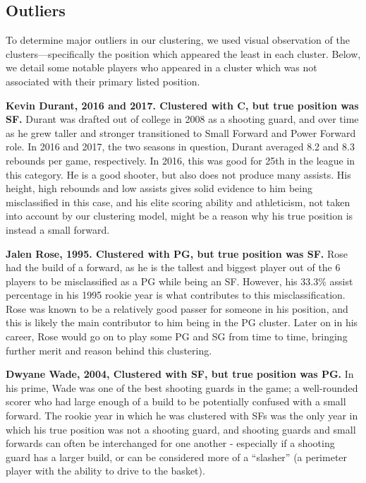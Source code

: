 \documentclass[./main.tex]{subfiles}
\begin{document}
\subsection{Outliers}
To determine major outliers in our clustering, we used visual observation of the clusters—specifically the position which appeared the least in each cluster. Below, we detail some notable players who appeared in a cluster which was not associated with their primary listed position.

\textbf{Kevin Durant, 2016 and 2017. Clustered with C, but true position was SF.} Durant was drafted out of college in 2008 as a shooting guard, and over time as he grew taller and stronger transitioned to Small Forward and Power Forward role. In 2016 and 2017, the two seasons in question, Durant averaged 8.2 and 8.3 rebounds per game, respectively. In 2016, this was good for 25th in the league in this category. He is a good shooter, but also does not produce many assists. His height, high rebounds and low assists gives solid evidence to him being misclassified in this case, and his elite scoring ability and athleticism, not taken into account by our clustering model, might be a reason why his true position is instead a small forward.

\textbf{Jalen Rose, 1995. Clustered with PG, but true position was SF.} Rose had the build of a forward, as he is the tallest and biggest player out of the 6 players to be misclassified as a PG while being an SF. However, his 33.3\% assist percentage in his 1995 rookie year is what contributes to this misclassification. Rose was known to be a relatively good passer for someone in his position, and this is likely the main contributor to him being in the PG cluster. Later on in his career, Rose would go on to play some PG and SG from time to time, bringing further merit and reason behind this clustering.

\textbf{Dwyane Wade, 2004, Clustered with SF, but true position was PG.} In his prime, Wade was one of the best shooting guards in the game; a well-rounded scorer who had large enough of a build to be potentially confused with a small forward. The rookie year in which he was clustered with SFs was the only year in which his true position was not a shooting guard, and shooting guards and small forwards can often be interchanged for one another - especially if a shooting guard has a larger build, or can be considered more of a ``slasher'' (a perimeter player with the ability to drive to the basket).
\end{document}
